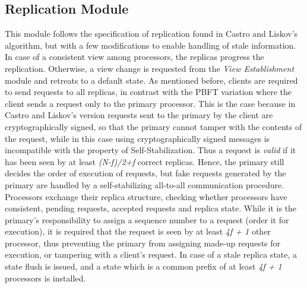 \documentclass[12pt,a4paper]{report}
\begin{document}
			 \subsection{Replication Module}
			    This module follows the specification of replication found in Castro and Liskov's algorithm, but with a few modifications to enable handling of stale information. In case of a consistent view among processors, the replicas progress the replication. Otherwise, a view change is requested from the \textit{View Establishment} module and retreats to a default state. As mentioned before, clients are required to send requests to all replicas, in contrast with the PBFT variation where the client sends a request only to the primary processor. This is the case because in Castro and Liskov's version requests sent to the primary by the client are cryptographically signed, so that the primary cannot tamper with the contents of the request, while in this case using cryptographically signed messages is incompatible with the property of Self-Stabilization. Thus a request is \textit{valid} if it has been seen by at least \textit{(N-f)/2+f} correct replicas. Hence, the primary still decides the order of execution of requests, but fake requests generated by the primary are handled by a self-stabilizing all-to-all communication procedure. Processors exchange their replica structure, checking whether processors have consistent, pending requests, accepted requests and replica state. While it is the primary's responsibility to assign a sequence number to a request (order it for execution), it is required that the request is seen by at least \textit{4f + 1} other processor, thus preventing the primary from assigning made-up requests for execution, or tampering with a client's request. In case of a stale replica state, a state flush is issued, and a state which is a common prefix of at least \textit{4f + 1} processors is installed.
			    		
\end{document}
